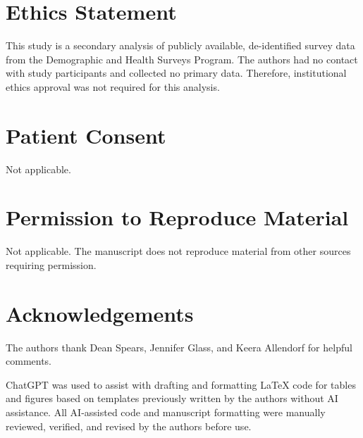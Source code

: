 \documentclass[12pt]{article}
\begin{document}
\section*{Ethics Statement}

This study is a secondary analysis of publicly available, de-identified survey data from the Demographic and Health Surveys Program. The authors had no contact with study participants and collected no primary data. Therefore, institutional ethics approval was not required for this analysis.

\section*{Patient Consent}

Not applicable.

\section*{Permission to Reproduce Material}

Not applicable. The manuscript does not reproduce material from other sources requiring permission.

\section*{Acknowledgements}
The authors thank Dean Spears, Jennifer Glass, and Keera Allendorf for helpful comments.

ChatGPT was used to assist with drafting and formatting LaTeX code for tables and figures based on templates previously written by the authors without AI assistance. All AI-assisted code and manuscript formatting were manually reviewed, verified, and revised by the authors before use.
\end{document}
